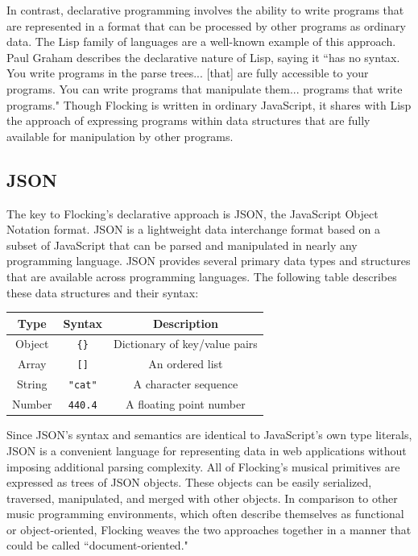 \documentclass{article}
\begin{document}
In contrast, declarative programming involves the ability to write programs that are represented in a format that can be processed by other programs as ordinary data. The Lisp family of languages are a well-known example of this approach. Paul Graham describes the declarative nature of Lisp, saying it ``has no syntax. You write programs in the parse trees... [that] are fully accessible to your programs. You can write programs that manipulate them... programs that write programs." Though Flocking is written in ordinary JavaScript, it shares with Lisp the approach of expressing programs within data structures that are fully available for manipulation by other programs.

\subsection{JSON}

The key to Flocking's declarative approach is JSON, the JavaScript Object Notation format. JSON is a lightweight data interchange format based on a subset of JavaScript that can be parsed and manipulated in nearly any programming language. JSON provides several primary data types and structures that are available across programming languages. The following table describes these data structures and their syntax:

\begin{tabular}{| c || c | c |}
    \hline
    \bf{Type} & \bf{Syntax} & \bf{Description} \\ \hline
    Object & \verb|{}| & Dictionary of key/value pairs \\ \hline
    Array & \verb|[]| & An ordered list \\ \hline
    String & \verb|"cat"| & A character sequence \\ \hline
    Number & \verb|440.4| & A floating point number \\ \hline
\end{tabular}

Since JSON's syntax and semantics are identical to JavaScript's own type literals, JSON is a convenient language for representing data in web applications without imposing additional parsing complexity. All of Flocking's musical primitives are expressed as trees of JSON objects. These objects can be easily serialized, traversed, manipulated, and merged with other objects. In comparison to other music programming environments, which often describe themselves as functional or object-oriented, Flocking weaves the two approaches together in a manner that could be called ``document-oriented."
\end{document}
